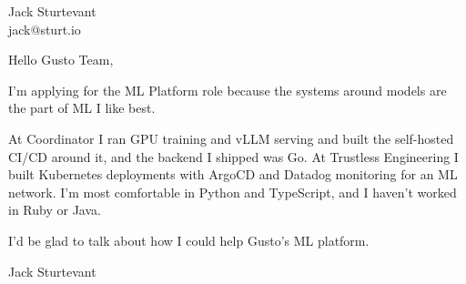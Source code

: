 \documentclass[11pt]{article}
\begin{document}
\raggedright

{\namefont\fontsize{20pt}{24pt}\selectfont Jack Sturtevant}\\[-0.3em]
jack@sturt.io

\vspace{1.2em}

Hello Gusto Team,

I'm applying for the ML Platform role because the systems around models are the part of ML I like best.

At Coordinator I ran GPU training and vLLM serving and built the self-hosted CI/CD around it, and the backend I shipped was Go. At Trustless Engineering I built Kubernetes deployments with ArgoCD and Datadog monitoring for an ML network. I'm most comfortable in Python and TypeScript, and I haven't worked in Ruby or Java.

I'd be glad to talk about how I could help Gusto's ML platform.

\vspace{0.6em}
Jack Sturtevant
\end{document}

